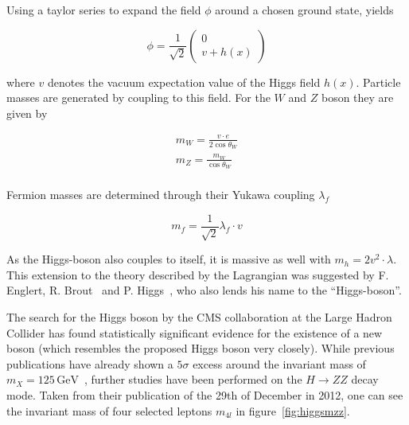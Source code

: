 Using a taylor series to expand the field $\phi$ around a chosen ground state, yields

\begin{equation}
  \label{eq:higgs-field-taylor}
  \phi = \frac{1}{\sqrt{2}}
  \begin{pmatrix}
    0 \\
    v + h(x)
  \end{pmatrix}
\end{equation}

\noindent where $v$ denotes the vacuum expectation value of the Higgs field $h(x)$. Particle masses are generated by coupling to this field. For the $W$ and $Z$ boson they are given by

\begin{align}
  \label{eq:higgs-couplings}
  m_W = \frac{v \cdot e}{2 \cos{\theta_W}} \\
  m_Z = \frac{m_W}{\cos{\theta_W}} \\
\end{align}

\noindent Fermion masses are determined through their Yukawa coupling $\lambda_f$

\begin{equation}
  \label{eq:higgs-fermion}
  m_f = \frac{1}{\sqrt{2}} \lambda_f \cdot v
\end{equation}

\noindent As the Higgs-boson also couples to itself, it is massive as well with $m_h = 2 v^2 \cdot \lambda$. This extension to the theory described by the Lagrangian was suggested by F. Englert, R. Brout~\cite{higgs-englert} and P. Higgs~\cite{higgs-peter}, who also lends his name to the ``Higgs-boson''.

The search for the Higgs boson by the CMS collaboration at the Large Hadron Collider has found statistically significant evidence for the existence of a new boson (which resembles the proposed Higgs boson very closely). While previous publications have already shown a $5 \sigma$ excess around the invariant mass of $m_X = 125\,\text{GeV}$~\cite{higgscls}, further studies have been performed on the $H \rightarrow ZZ$ decay mode. Taken from their publication of the 29th of December in 2012, one can see the invariant mass of four selected leptons $m_{4 l}$ in figure~\ref{fig:higgsmzz}.

